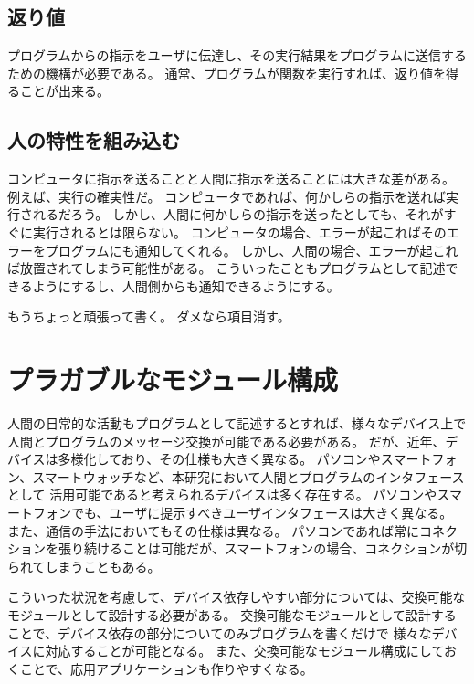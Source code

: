 \subsection{返り値}\label{ux8fd4ux308aux5024}

プログラムからの指示をユーザに伝達し、その実行結果をプログラムに送信するための機構が必要である。
通常、プログラムが関数を実行すれば、返り値を得ることが出来る。

\subsection{人の特性を組み込む}\label{ux4ebaux306eux7279ux6027ux3092ux7d44ux307fux8fbcux3080}

コンピュータに指示を送ることと人間に指示を送ることには大きな差がある。
例えば、実行の確実性だ。
コンピュータであれば、何かしらの指示を送れば実行されるだろう。
しかし、人間に何かしらの指示を送ったとしても、それがすぐに実行されるとは限らない。
コンピュータの場合、エラーが起こればそのエラーをプログラムにも通知してくれる。
しかし、人間の場合、エラーが起これば放置されてしまう可能性がある。
こういったこともプログラムとして記述できるようにするし、人間側からも通知できるようにする。

もうちょっと頑張って書く。 ダメなら項目消す。

\section{プラガブルなモジュール構成}\label{sec:plaggable-module-design}

人間の日常的な活動もプログラムとして記述するとすれば、様々なデバイス上で人間とプログラムのメッセージ交換が可能である必要がある。
だが、近年、デバイスは多様化しており、その仕様も大きく異なる。
パソコンやスマートフォン、スマートウォッチなど、本研究において人間とプログラムのインタフェースとして
活用可能であると考えられるデバイスは多く存在する。
パソコンやスマートフォンでも、ユーザに提示すべきユーザインタフェースは大きく異なる。
また、通信の手法においてもその仕様は異なる。
パソコンであれば常にコネクションを張り続けることは可能だが、スマートフォンの場合、コネクションが切られてしまうこともある。

こういった状況を考慮して、デバイス依存しやすい部分については、交換可能なモジュールとして設計する必要がある。
交換可能なモジュールとして設計することで、デバイス依存の部分についてのみプログラムを書くだけで
様々なデバイスに対応することが可能となる。
また、交換可能なモジュール構成にしておくことで、応用アプリケーションも作りやすくなる。

